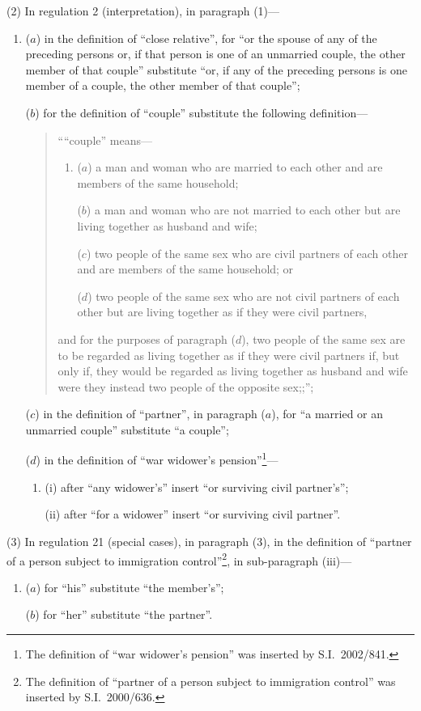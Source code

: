 \documentclass[12pt,a4paper]{article}
\begin{document}
(2) In regulation 2 (interpretation), in paragraph (1)—
\begin{enumerate}\item[]
($a$) in the definition of “close relative”, for “or the spouse of any of the preceding persons or, if that person is one of an unmarried couple, the other member of that couple” substitute “or, if any of the preceding persons is one member of a couple, the other member of that couple”;

($b$) for the definition of “couple” substitute the following definition—
\begin{quotation}
““couple” means—
\begin{enumerate}\item[]
($a$) 
a man and woman who are married to each other and are members of the same household;

($b$) 
a man and woman who are not married to each other but are living together as husband and wife;

($c$) 
two people of the same sex who are civil partners of each other and are members of the same household; or

($d$) 
two people of the same sex who are not civil partners of each other but are living together as if they were civil partners,
\end{enumerate}
and for the purposes of paragraph ($d$), two people of the same sex are to be regarded as living together as if they were civil partners if, but only if, they would be regarded as living together as husband and wife were they instead two people of the opposite sex;;”;
\end{quotation}

($c$) in the definition of “partner”, in paragraph ($a$), for “a married or an unmarried couple” substitute “a couple”;

($d$) in the definition of “war widower’s pension”\footnote{The definition of “war widower’s pension” was inserted by S.I.\ 2002/841.}—
\begin{enumerate}\item[]
(i) after “any widower's” insert “or surviving civil partner's”;

(ii) after “for a widower” insert “or surviving civil partner”.
\end{enumerate}
\end{enumerate}

(3) In regulation 21 (special cases), in paragraph (3), in the definition of “partner of a person subject to immigration control”\footnote{The definition of “partner of a person subject to immigration control” was inserted by S.I.\ 2000/636.}, in sub-paragraph (iii)—
\begin{enumerate}\item[]
($a$) for “his” substitute “the member's”;

($b$) for “her” substitute “the partner”.
\end{enumerate}
\end{document}
